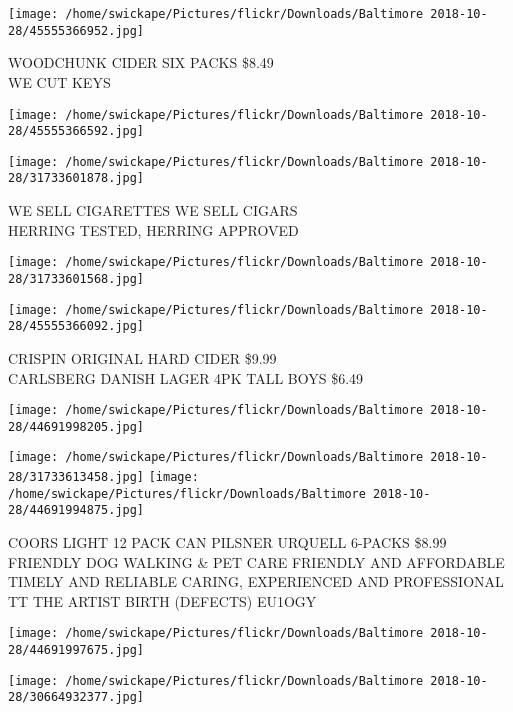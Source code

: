 \documentclass[10pt,letterpaper]{article}
\begin{document}
\vspace{0.25in}
\texttt{[image: /home/swickape/Pictures/flickr/Downloads/Baltimore 2018-10-28/45555366952.jpg]}

WOODCHUNK CIDER SIX PACKS \$8.49\\
WE CUT KEYS\\
\pagebreak

\texttt{[image: /home/swickape/Pictures/flickr/Downloads/Baltimore 2018-10-28/45555366592.jpg]}

\vspace{0.25in}
\texttt{[image: /home/swickape/Pictures/flickr/Downloads/Baltimore 2018-10-28/31733601878.jpg]}

WE SELL CIGARETTES WE SELL CIGARS\\
HERRING TESTED, HERRING APPROVED\\
\pagebreak

\texttt{[image: /home/swickape/Pictures/flickr/Downloads/Baltimore 2018-10-28/31733601568.jpg]}

\vspace{0.25in}
\texttt{[image: /home/swickape/Pictures/flickr/Downloads/Baltimore 2018-10-28/45555366092.jpg]}

CRISPIN ORIGINAL HARD CIDER \$9.99\\
CARLSBERG DANISH LAGER 4PK TALL BOYS \$6.49\\
\pagebreak

\texttt{[image: /home/swickape/Pictures/flickr/Downloads/Baltimore 2018-10-28/44691998205.jpg]}

\vspace{0.25in}
\texttt{[image: /home/swickape/Pictures/flickr/Downloads/Baltimore 2018-10-28/31733613458.jpg]}
\texttt{[image: /home/swickape/Pictures/flickr/Downloads/Baltimore 2018-10-28/44691994875.jpg]}

COORS LIGHT 12 PACK CAN PILSNER URQUELL 6{-}PACKS \$8.99\\
FRIENDLY DOG WALKING \& PET CARE FRIENDLY AND AFFORDABLE TIMELY AND RELIABLE CARING, EXPERIENCED AND PROFESSIONAL\\
TT THE ARTIST BIRTH (DEFECTS) EU1OGY\\
\pagebreak

\texttt{[image: /home/swickape/Pictures/flickr/Downloads/Baltimore 2018-10-28/44691997675.jpg]}

\vspace{0.25in}
\texttt{[image: /home/swickape/Pictures/flickr/Downloads/Baltimore 2018-10-28/30664932377.jpg]}
\end{document}
